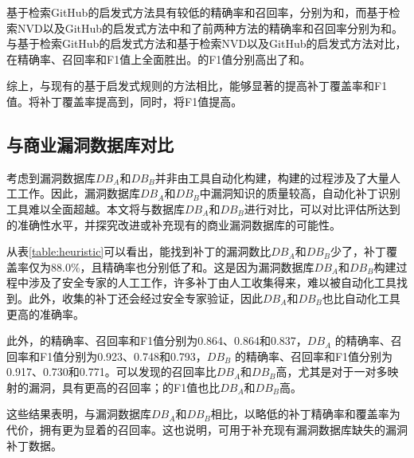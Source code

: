 基于检索GitHub的启发式方法具有较低的精确率和召回率，分别为和，而基于检索NVD以及GitHub的启发式方法中和了前两种方法的精确率和召回率分别为和。与基于检索GitHub的启发式方法和基于检索NVD以及GitHub的启发式方法对比，\tool 在精确率、召回率和F1值上全面胜出。\tool 的F1值分别高出了和。

综上，与现有的基于启发式规则的方法相比，\tool 能够显著的提高补丁覆盖率和F1值。\tool 将补丁覆盖率提高到，同时，将F1值提高。


\subsection{与商业漏洞数据库对比}

考虑到漏洞数据库$DB_A$和$DB_B$并非由工具自动化构建，构建的过程涉及了大量人工工作。因此，漏洞数据库$DB_A$和$DB_B$中漏洞知识的质量较高，自动化补丁识别工具难以全面超越。本文将\tool 与数据库$DB_A$和$DB_B$进行对比，可以对比评估\tool 所达到的准确性水平，并探究\tool 改进或补充现有的商业漏洞数据库的可能性。%

从表\ref{table:heuristic}可以看出，\tool 能找到补丁的漏洞数比$DB_A$和$DB_B$少了，补丁覆盖率仅为88.0\%，且精确率也分别低了和。这是因为漏洞数据库$DB_A$和$DB_B$构建过程中涉及了安全专家的人工工作，许多补丁由人工收集得来，难以被自动化工具找到。此外，收集的补丁还会经过安全专家验证，因此$DB_A$和$DB_B$也比自动化工具更高的准确率。

此外，\tool 的精确率、召回率和F1值分别为0.864、0.864和0.837，$DB_A$ 的精确率、召回率和F1值分别为0.923、0.748和0.793，$DB_B$ 的精确率、召回率和F1值分别为0.917、0.730和0.771。可以发现\tool 的召回率比$DB_A$和$DB_B$高，尤其是对于一对多映射的漏洞，\tool 具有更高的召回率；\tool 的F1值也比$DB_A$和$DB_B$高。

这些结果表明，与漏洞数据库$DB_A$和$DB_B$相比，\tool 以略低的补丁精确率和覆盖率为代价，拥有更为显着的召回率。这也说明，\tool 可用于补充现有漏洞数据库缺失的漏洞补丁数据。

